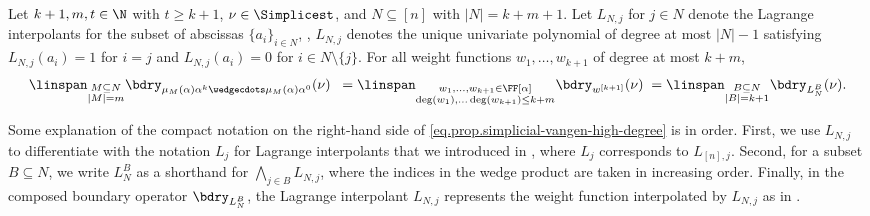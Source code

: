 \documentclass{toc}
\begin{document}
\begin{proposition}\label{prop.simplicial-vangen-high-degree}
Let \(k+1,m,t \in \N\) with $t \ge k+1$, $\nu \in \Simplicest$, and $N \subseteq [n]$ with $|N|=k+m+1$. Let $L_{N,j}$ for $j \in N$ denote the Lagrange interpolants for the subset of abscissas $\{a_i\}_{i \in N}$, \ie, $L_{N,j}$ denotes the unique univariate polynomial of degree at most $|N|-1$ satisfying $L_{N,j}(a_i)=1$ for $i=j$ and $L_{N,j}(a_i) = 0$ for $i \in N \setminus \{j\}$.
For all weight functions $w_1, \dots, w_{k+1}$ of degree at most $k+m$, 
\begin{equation}\label{eq.prop.simplicial-vangen-high-degree}
\linspan_{\substack{M \subseteq N \\ |M|=m}} \bdry_{\mu_M(\alpha)\alpha^k\wedgecdots\mu_M(\alpha)\alpha^0}(\nu) \; \;
= 
\linspan_{\substack{w_1, \dots, w_{k+1} \in \FF[\alpha] \\ \deg(w_1), \dots \deg(w_{k+1}) \le k+m}}
\bdry_{w^{[k+1]}}(\nu) \;
=
\linspan_{\substack{B \subseteq N \\ |B|=k+1}} \bdry_{L_N^B}(\nu).
\end{equation}
\end{proposition}
Some explanation of the compact notation on the right-hand side of \eqref{eq.prop.simplicial-vangen-high-degree} is in order. First, we use $L_{N,j}$ to differentiate with the notation $L_j$ for Lagrange interpolants that we introduced in , where $L_j$ corresponds to $L_{[n],j}$. Second, for a subset $B \subseteq N$, we write $L_N^B$ as a shorthand for $\bigwedge_{j\in B} L_{N,j}$, where the indices in the wedge product are taken in increasing order. Finally, in the composed boundary operator $\bdry_{L_N^B}$, the Lagrange interpolant $L_{N,j}$ represents the weight function interpolated by $L_{N,j}$ as in 
. 
\end{document}
